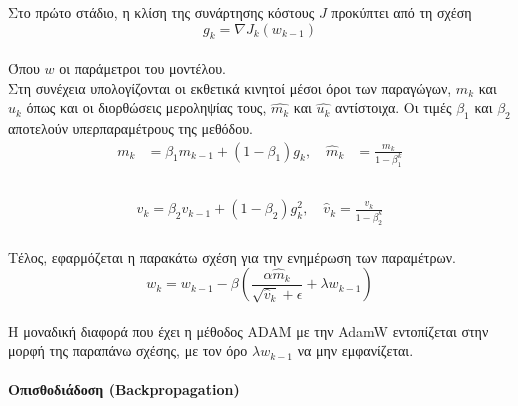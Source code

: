\documentclass[12pt]{article}
\numberwithin{equation}{section}
\begin{document}
\noindent Στο πρώτο στάδιο, η κλίση της συνάρτησης κόστους \(J\) προκύπτει από τη σχέση\\

\begin{equation}
g_{k} = \nabla J_{k}(w_{k-1})
\end{equation}\\

\noindent Όπου \(w\) οι παράμετροι του μοντέλου.\\

\noindent Στη συνέχεια υπολογίζονται οι εκθετικά κινητοί μέσοι όροι των παραγώγων, \(m_k\) και \(u_k\) όπως και οι διορθώσεις μεροληψίας τους, \(\hat{m_k}\) και \(\hat{u_k}\) αντίστοιχα. Οι τιμές \(\beta_{1}\) και \(\beta_{2}\) αποτελούν υπερπαραμέτρους της μεθόδου.\\


\begin{equation}
\begin{aligned}
m_k &= \beta_1 m_{k-1} + (1 - \beta_1) g_k, \quad
\hat{m}_k &= \frac{m_k}{1 - \beta_1^k}\\
\end{aligned}
\end{equation}\\

\begin{equation}
\begin{aligned}
v_k = \beta_2 v_{k-1} + (1 - \beta_2) g_k^2, \quad 
\hat{v}_k = \frac{v_k}{1 - \beta_2^k}
\end{aligned}
\end{equation}\\

\noindent Τέλος, εφαρμόζεται η παρακάτω σχέση για την ενημέρωση των παραμέτρων.\\

\begin{equation}
w_{k} = w_{k-1} - \beta \left( \frac{\alpha \hat{m}_k}{\sqrt{\hat{v}_k} + \epsilon} + \lambda w_{k-1} \right)
\end{equation}\\

\noindent Η μοναδική διαφορά που έχει η μέθοδος ADAM με την AdamW εντοπίζεται στην μορφή της παραπάνω σχέσης, με τον όρο \(\lambda w_{k-1}\) να μην εμφανίζεται.\\

\paragraph{Οπισθοδιάδοση (Backpropagation) \\ [0.5 cm]}
\end{document}
